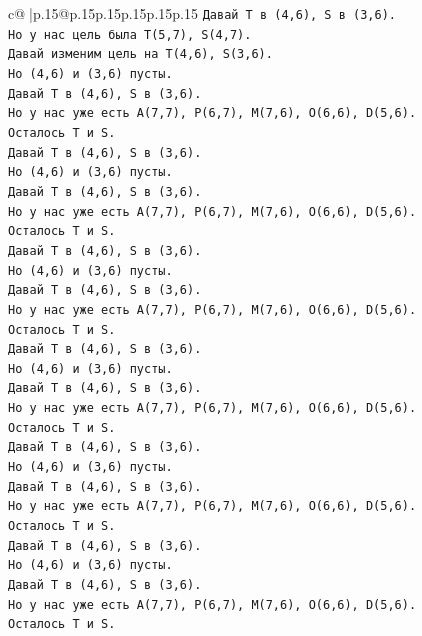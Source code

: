 \documentclass{article}
\begin{document}
{\begin{supertabular}{c@{$\;$}|p{.15\linewidth}@{}p{.15\linewidth}p{.15\linewidth}p{.15\linewidth}p{.15\linewidth}p{.15\linewidth}}
{{{\texttt{Давай T в (4,6), S в (3,6).} \\
\texttt{Но у нас цель была T(5,7), S(4,7).} \\
\texttt{Давай изменим цель на T(4,6), S(3,6).} \\
\texttt{Но (4,6) и (3,6) пусты.} \\
\texttt{Давай T в (4,6), S в (3,6).} \\
\texttt{Но у нас уже есть A(7,7), P(6,7), M(7,6), O(6,6), D(5,6).} \\
\texttt{Осталось T и S.} \\
\texttt{Давай T в (4,6), S в (3,6).} \\
\texttt{Но (4,6) и (3,6) пусты.} \\
\texttt{Давай T в (4,6), S в (3,6).} \\
\texttt{Но у нас уже есть A(7,7), P(6,7), M(7,6), O(6,6), D(5,6).} \\
\texttt{Осталось T и S.} \\
\texttt{Давай T в (4,6), S в (3,6).} \\
\texttt{Но (4,6) и (3,6) пусты.} \\
\texttt{Давай T в (4,6), S в (3,6).} \\
\texttt{Но у нас уже есть A(7,7), P(6,7), M(7,6), O(6,6), D(5,6).} \\
\texttt{Осталось T и S.} \\
\texttt{Давай T в (4,6), S в (3,6).} \\
\texttt{Но (4,6) и (3,6) пусты.} \\
\texttt{Давай T в (4,6), S в (3,6).} \\
\texttt{Но у нас уже есть A(7,7), P(6,7), M(7,6), O(6,6), D(5,6).} \\
\texttt{Осталось T и S.} \\
\texttt{Давай T в (4,6), S в (3,6).} \\
\texttt{Но (4,6) и (3,6) пусты.} \\
\texttt{Давай T в (4,6), S в (3,6).} \\
\texttt{Но у нас уже есть A(7,7), P(6,7), M(7,6), O(6,6), D(5,6).} \\
\texttt{Осталось T и S.} \\
\texttt{Давай T в (4,6), S в (3,6).} \\
\texttt{Но (4,6) и (3,6) пусты.} \\
\texttt{Давай T в (4,6), S в (3,6).} \\
\texttt{Но у нас уже есть A(7,7), P(6,7), M(7,6), O(6,6), D(5,6).} \\
\texttt{Осталось T и S.} \\
}}}
\end{supertabular}}
\end{document}

